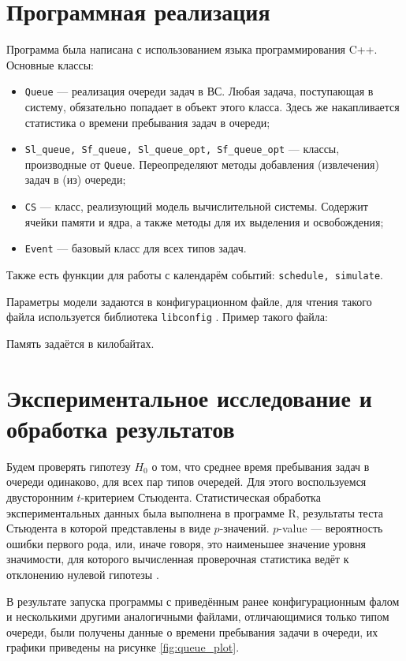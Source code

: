 \documentclass[russian, 14pt, a4paper]{extreport}
\begin{document}
\chapter{Программная реализация}
Программа была написана с использованием языка программирования C++. Основные классы:
\begin{itemize}
\item \verb:Queue: --- реализация очереди задач в ВС. Любая задача, поступающая в систему, обязательно попадает в объект этого класса. Здесь же накапливается статистика о времени пребывания задач в очереди;
\item \verb:Sl_queue, Sf_queue, Sl_queue_opt, Sf_queue_opt: --- классы, производные от \verb:Queue:. Переопределяют методы добавления (извлечения) задач в (из) очереди;
\item \verb:CS: --- класс, реализующий модель вычислительной системы. Содержит ячейки памяти и ядра, а также методы для их выделения и освобождения;
\item \verb:Event: --- базовый класс для всех типов задач.
\end{itemize}

Также есть функции для работы с календарём событий: \verb:schedule, simulate:.

Параметры модели задаются в конфигурационном файле, для чтения такого файла используется библиотека \verb:libconfig: \cite{web:lc}. Пример такого файла:


Память задаётся в килобайтах. 
\chapter{Экспериментальное исследование и обработка результатов}
Будем проверять гипотезу \(H_0\) о том, что среднее время пребывания задач в очереди одинаково, для всех пар типов очередей. Для этого воспользуемся двусторонним \(t\)-критерием Стьюдента. Статистическая обработка экспериментальных данных была выполнена в программе R, результаты теста Стьюдента в которой представлены в виде \(p\)-значений. \(p\)-value --- вероятность ошибки первого рода, или, иначе говоря, это наименьшее значение уровня значимости, для которого вычисленная проверочная статистика ведёт к отклонению нулевой гипотезы \cite{web:ds}.

В результате запуска программы с приведённым ранее конфигурационным фалом и несколькими другими аналогичными файлами, отличающимися только типом очереди, были получены данные о времени пребывания задачи в очереди, их графики приведены на рисунке \ref{fig:queue_plot}.
\end{document}
